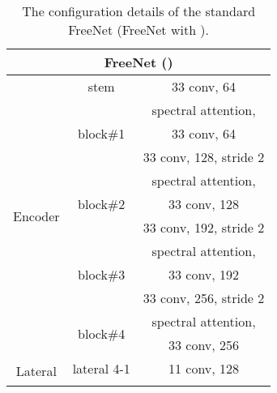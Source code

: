 \documentclass[journal]{IEEEtran}
\begin{document}
\begin{table}[htb]
  \caption{The configuration details of the standard FreeNet (FreeNet with ).
    \label{tab:freenet_setting}}
  \centering
  \renewcommand{\arraystretch}{1.5}
  \begin{tabular}{ccc}
    \hline
    \multicolumn{3}{c}{FreeNet ()}                                                                                        \\ \hline
    \multicolumn{1}{c|}{\multirow{12}{*}{Encoder}} & \multicolumn{1}{c|}{stem}                      & 33 conv, 64            \\ \cline{2-3}
    \multicolumn{1}{c|}{}                          & \multicolumn{1}{c|}{\multirow{3}{*}{block\#1}} & spectral attention,    \\
    \multicolumn{1}{c|}{}                          & \multicolumn{1}{c|}{}                          & 33 conv, 64            \\
    \multicolumn{1}{c|}{}                          & \multicolumn{1}{c|}{}                          & 33 conv, 128, stride 2 \\ \cline{2-3}
    \multicolumn{1}{c|}{}                          & \multicolumn{1}{c|}{\multirow{3}{*}{block\#2}} & spectral attention,    \\
    \multicolumn{1}{c|}{}                          & \multicolumn{1}{c|}{}                          & 33 conv, 128           \\
    \multicolumn{1}{c|}{}                          & \multicolumn{1}{c|}{}                          & 33 conv, 192, stride 2 \\ \cline{2-3}
    \multicolumn{1}{c|}{}                          & \multicolumn{1}{c|}{\multirow{3}{*}{block\#3}} & spectral attention,    \\
    \multicolumn{1}{c|}{}                          & \multicolumn{1}{c|}{}                          & 33 conv, 192           \\
    \multicolumn{1}{c|}{}                          & \multicolumn{1}{c|}{}                          & 33 conv, 256, stride 2 \\ \cline{2-3}
    \multicolumn{1}{c|}{}                          & \multicolumn{1}{c|}{\multirow{2}{*}{block\#4}} & spectral attention,    \\
    \multicolumn{1}{c|}{}                          & \multicolumn{1}{c|}{}                          & 33 conv, 256           \\ \hline
    \multicolumn{1}{c|}{\multirow{4}{*}{Lateral}}  & \multicolumn{1}{c|}{lateral 4-1}               & 11 conv, 128           \\ \cline{2-3}

\end{tabular}
\end{table}
\end{document}
